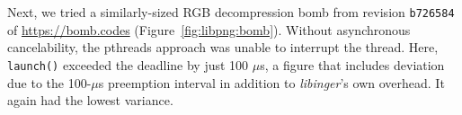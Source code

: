 Next, we tried a similarly-sized RGB decompression bomb from revision
\texttt{b726584} of \url{https://bomb.codes} (Figure~\ref{fig:libpng:bomb}).  Without
asynchronous cancelability, the pthreads approach was unable to interrupt the thread.
Here, \texttt{launch()} exceeded the deadline by just 100
$\mu$s, a figure that includes deviation due to the 100-$\mu$s preemption interval in
addition to \textit{libinger}'s own overhead.  It again had the lowest variance.

